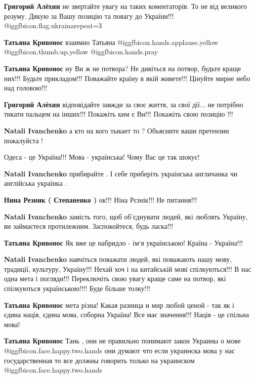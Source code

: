 \begin{itemize}
\begin{itemize}
\textbf{Григорий Алёхин} не звертайте увагу на таких коментаторів. То не від великого розуму. Дякую за Вашу позицію та повагу до України!!! @igg{fbicon.flag.ukraina}{repeat=3}

\textbf{Татьяна Кривонос} взаимно Татьяна  @igg{fbicon.hands.applause.yellow}  @igg{fbicon.thumb.up.yellow}  @igg{fbicon.hands.pray} 

\textbf{Татьяна Кривонос} ну Ви ж не потвора?
Не дивіться на потвор, будьте краще них!!!
Будьте прикладом!!!
Поважайте країну в якій живете!!!
Цінуйте мирне небо над головою!!!

\textbf{Григорий Алёхин} відповідайте завжди за своє життя, за свої дії... не потрібно тикати пальцем на інших!!!
Покажіть ким є Ви!!!
Покажіть свою позицію !!!

\textbf{Natali Ivanchenko} а кто на кого тыкает то ? Объясните ваши претензии пожалуйста !

Одеса - це Україна!!!
Мова - українська!
Чому Вас це так шокує!

\textbf{Natali Ivanchenko} прибирайте . І себе приберіть украінська англичанка чи англійська українка .

\textbf{Нина Резник ( Степаненко )} ок!!! Ніна Рєзнік!!! Не питання!!!

\textbf{Natali Ivanchenko} замість того, щоб об'єднувати людей, які люблять Україну, ви займаєтеся протилежним. Заспокойтеся, будь ласка!!!

\textbf{Татьяна Кривонос} Як вже це набридло - ім‘я українською! Країна - Україна!!!

\textbf{Natali Ivanchenko} навчіться поважати людей, які поважають нашу мову, традиції, культуру, Україну!!! Нехай хоч і на китайській мові спілкуються!!! В нас одна мета і погляди!!!
Переключіть свою увагу краще саме на потвор, які спілкуються українською!!!! Буде більше толку!!!

\textbf{Татьяна Кривонос} мета різна! Какая разница и мир любой ценой - так як і єдина нація, єдина мова, соборна Україна! Все має значення!!! Нація - це спільна мова!

\textbf{Татьяна Кривонос} Тань , они не правильно понимают закон Украины о мове  @igg{fbicon.face.happy.two.hands}  они думают что если украинска мова у нас государственная то все должны говорить только на украинском  @igg{fbicon.face.happy.two.hands} 


\end{itemize}
\end{itemize}
